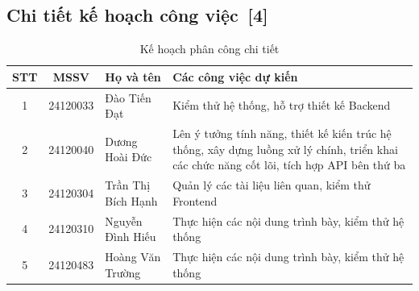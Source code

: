\documentclass[12pt, a4paper]{article}
\begin{document}
\subsection[Chi tiết kế hoạch công việc]{Chi tiết kế hoạch công việc \,{\normalfont\small\textcolor{cyan!70!black}{[4]}}}
\renewcommand{\arraystretch}{1.5}
\begin{table}[H]
    \centering
    \begin{tabularx}{\textwidth}{|c|c|l|X|}
    \hline
    \textbf{STT} & \textbf{MSSV} & \textbf{Họ và tên} & \textbf{Các công việc dự kiến} \\
    \hline
    
    1 & 24120033 & Đào Tiến Đạt & Kiểm thử hệ thống, hỗ trợ thiết kế Backend \\[1cm]
    \hline
    2 & 24120040 & Dương Hoài Đức & Lên ý tưởng tính năng, thiết kế kiến trúc hệ thống, xây dựng luồng xử lý chính, triển khai các chức năng cốt lõi, tích hợp API bên thứ ba \\[1cm]
    \hline
    3 & 24120304 & Trần Thị Bích Hạnh & Quản lý các tài liệu liên quan, kiểm thử Frontend \\[1cm]
    \hline
    4 & 24120310 & Nguyễn Đình Hiếu & Thực hiện các nội dung trình bày, kiểm thử hệ thống \\[1cm]
    \hline
    5 & 24120483 & Hoàng Văn Trường & Thực hiện các nội dung trình bày, kiểm thử hệ thống \\[1cm]
    \hline
    \end{tabularx}
    \caption{Kế hoạch phân công chi tiết}
\end{table}
\end{document}
